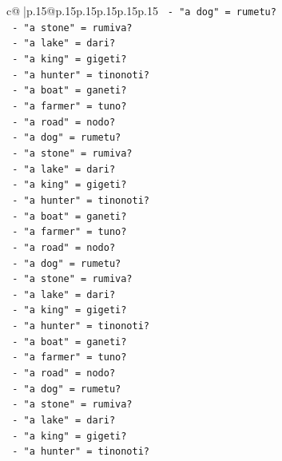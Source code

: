 \documentclass{article}
\begin{document}
{\begin{supertabular}{c@{$\;$}|p{.15\linewidth}@{}p{.15\linewidth}p{.15\linewidth}p{.15\linewidth}p{.15\linewidth}p{.15\linewidth}}
{{{\texttt{                {-} "a dog" = rumetu?} \\
\texttt{                {-} "a stone" = rumiva?} \\
\texttt{                {-} "a lake" = dari?} \\
\texttt{                {-} "a king" = gigeti?} \\
\texttt{                {-} "a hunter" = tinonoti?} \\
\texttt{                {-} "a boat" = ganeti?} \\
\texttt{                {-} "a farmer" = tuno?} \\
\texttt{                {-} "a road" = nodo?} \\
\texttt{                {-} "a dog" = rumetu?} \\
\texttt{                {-} "a stone" = rumiva?} \\
\texttt{                {-} "a lake" = dari?} \\
\texttt{                {-} "a king" = gigeti?} \\
\texttt{                {-} "a hunter" = tinonoti?} \\
\texttt{                {-} "a boat" = ganeti?} \\
\texttt{                {-} "a farmer" = tuno?} \\
\texttt{                {-} "a road" = nodo?} \\
\texttt{                {-} "a dog" = rumetu?} \\
\texttt{                {-} "a stone" = rumiva?} \\
\texttt{                {-} "a lake" = dari?} \\
\texttt{                {-} "a king" = gigeti?} \\
\texttt{                {-} "a hunter" = tinonoti?} \\
\texttt{                {-} "a boat" = ganeti?} \\
\texttt{                {-} "a farmer" = tuno?} \\
\texttt{                {-} "a road" = nodo?} \\
\texttt{                {-} "a dog" = rumetu?} \\
\texttt{                {-} "a stone" = rumiva?} \\
\texttt{                {-} "a lake" = dari?} \\
\texttt{                {-} "a king" = gigeti?} \\
\texttt{                {-} "a hunter" = tinonoti?} \\
}}}
\end{supertabular}}
\end{document}
